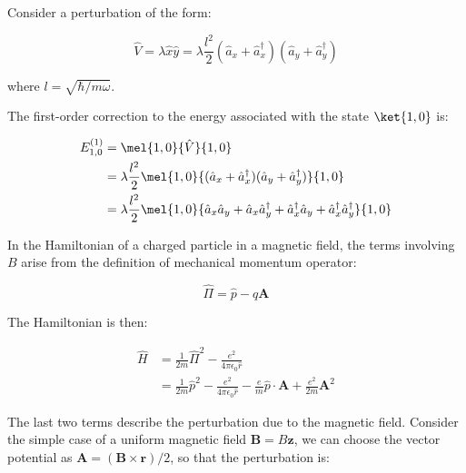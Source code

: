 \documentclass[12pt]{article}
\begin{document}
Consider a perturbation of the form:

\begin{equation}
    \hat{V} = \lambda \hat{x}\hat{y} = \lambda \frac{l^{2}}{2} (\hat{a}_{x} + \hat{a}_{x}^{\dagger})(\hat{a}_{y} + \hat{a}_{y}^{\dagger})
\end{equation}

where $l = \sqrt{\hbar/m\omega}$.

The first-order correction to the energy associated with the state $\ket{1, 0}$ is:

\begin{equation}
    \begin{split}
        E_{1, 0}^{(1)} &= \mel{1, 0}{\hat{V}}{1, 0} \\
        &= \lambda \frac{l^{2}}{2} \mel{1, 0}{(\hat{a}_{x} + \hat{a}_{x}^{\dagger})(\hat{a}_{y} + \hat{a}_{y}^{\dagger})}{1, 0} \\
        &= \lambda \frac{l^{2}}{2}  \mel{1, 0}{\hat{a}_{x} \hat{a}_{y} + \hat{a}_{x} \hat{a}_{y}^{\dagger} + \hat{a}_{x}^{\dagger} \hat{a}_{y} + \hat{a}_{x}^{\dagger} \hat{a}_{y}^{\dagger}}{1, 0} \\
    \end{split}
\end{equation}


In the Hamiltonian of a charged particle in a magnetic field, the terms involving $B$ arise from the definition of mechanical momentum operator:

\begin{equation}
    \hat{\Pi} = \hat{p} - q \mathbf{A}
\end{equation}

The Hamiltonian is then:

\begin{equation}
    \begin{split}
        \hat{H} &= \frac{1}{2m} \hat{\Pi}^{2} - \frac{e^{2}}{4\pi \epsilon_{0} \hat{r}} \\
        &= \frac{1}{2m} \hat{p}^{2} - \frac{e^{2}}{4\pi \epsilon_{0} \hat{r}} - \frac{e}{m} \hat{p} \cdot \mathbf{A} + \frac{e^{2}}{2m} \mathbf{A}^{2}
    \end{split}
\end{equation}

The last two terms describe the perturbation due to the magnetic field. Consider the simple case of a uniform magnetic field $\mathbf{B} = B\mathbf{z}$, we can choose the vector potential as $\mathbf{A} = (\mathbf{B} \times \mathbf{r})/2$, so that the perturbation is:
\end{document}
